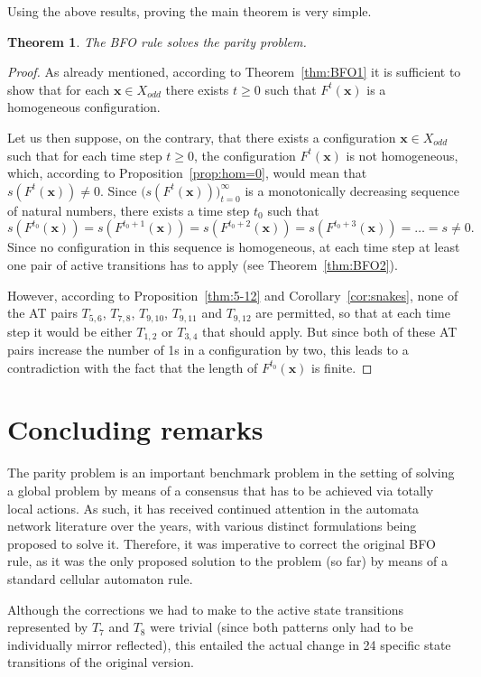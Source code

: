 \documentclass{sn-jnl}
\newtheorem{thm}{Theorem}%
\newcommand{\xodd}{X_{odd}}
\newcommand{\bx}{\mathbf{x}}
\begin{document}
Using the above results, proving the main theorem is very simple.
\begin{thm}\label{main}
    The BFO rule solves the parity problem.
\end{thm}
\begin{proof}
As already mentioned, according to Theorem~\ref{thm:BFO1} it is sufficient to show that for each $\bx\in\xodd$ there exists $t\geq 0$ such that $F^t(\bx)$ is a homogeneous configuration. 

Let us then suppose, on the contrary, that there exists a configuration $\bx \in \xodd$ such that for each time step $t\geq 0$, the configuration $F^t(\bx)$ is not homogeneous, which, according to Proposition~\ref{prop:hom=0}, would mean that $s(F^t(\bx))\neq 0$. Since $\big(s(F^t(\bx))\big)^\infty_{t=0}$ is a monotonically decreasing sequence of natural numbers, there exists a time step $t_0$ such that
    \[
s(F^{t_0}(\bx))=s(F^{t_0+1}(\bx))=s(F^{t_0+2}(\bx))=s(F^{t_0+3}(\bx))=\dots =s\neq 0.    
    \]
Since no configuration in this sequence is homogeneous, at each time step at least one pair of active transitions has to apply (see Theorem~\ref{thm:BFO2}). 

However, according to Proposition~\ref{thm:5-12} and Corollary~\ref{cor:snakes}, none of the AT pairs $T_{5,6}$, $T_{7,8}$, $T_{9,10}$, $T_{9,11}$ and $T_{9,12}$ are permitted, so that at each time step it would be either $T_{1,2}$ or $T_{3,4}$ that should apply. But since both of these AT pairs increase the number of 1s in a configuration by two, this leads to a contradiction with the fact that the length of $F^{t_0}(\bx)$ is finite.
\end{proof}


\section{Concluding remarks}
\label{sec:conclusion}

The parity problem is an important benchmark problem in the setting of solving a global problem by means of a consensus that has to be achieved via totally local actions. As such, it has received continued attention in the automata network literature over the years, with various distinct formulations being proposed to solve it. Therefore, it was imperative to correct the original BFO rule, as it was the only proposed solution to the problem (so far) by means of a standard cellular automaton rule. 

Although the corrections we had to make to the active state transitions represented by $T_7$ and $T_8$ were trivial (since both patterns only had to be individually mirror reflected), this entailed the actual change in 24 specific state transitions of the original version.
\end{document}

